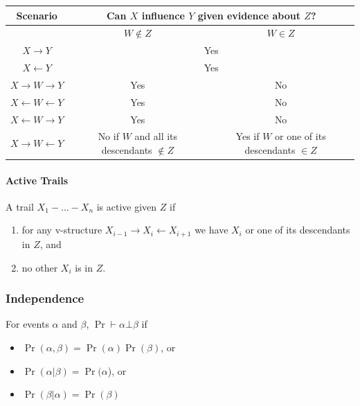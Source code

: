 \documentclass[12pt]{article}
\begin{document}
\begin{center}
\begin{tabular}{|c|c|c|}
    \hline
    Scenario & \multicolumn{2}{|c|}{Can $X$ influence $Y$ given evidence about $Z$?} \\ \hline
     & $W \not\in Z$ & $W \in Z$  \\ \hline

    $X \rightarrow Y$ & \multicolumn{2}{|c|}{Yes} \\

    $X \leftarrow Y$ & \multicolumn{2}{|c|}{Yes} \\

    $X \rightarrow W \rightarrow Y$ & Yes & No \\

    $X \leftarrow W \leftarrow Y$ & Yes & No \\

    $X \leftarrow W \rightarrow Y$ & Yes & No \\

    $X \rightarrow W \leftarrow Y$ & No if $W$ and all its descendants $\not\in Z$ & Yes if $W$ or one of its descendants $\in Z$\\
    \hline
  \end{tabular}
\end{center}

\paragraph{Active Trails}
A trail $X_1 - \ldots - X_n$ is active given $Z$ if
\begin{enumerate}
\item for any v-structure $X_{i-1} \rightarrow X_i \leftarrow X_{i+1}$ we have $X_i$ or one of its descendants in $Z$, and

\item no other $X_i$ is in $Z$.

\end{enumerate}


\subsubsection{Independence}
For events $\alpha$ and $\beta$, $\Pr \vdash \alpha \bot \beta$ if

\begin{itemize}
  \item $\Pr(\alpha, \beta) = \Pr(\alpha) \Pr(\beta)$, or

  \item $\Pr(\alpha | \beta) = \Pr(\alpha$), or

  \item $\Pr(\beta | \alpha) = \Pr(\beta)$
\end{itemize}
\end{document}
